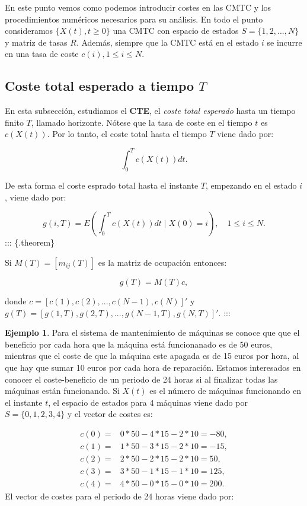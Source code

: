 \documentclass[
]{book}
\theoremstyle{definition}
\theoremstyle{definition}
\newtheorem{example}{Ejemplo}[chapter]
\theoremstyle{definition}
\theoremstyle{definition}
\theoremstyle{remark}
\begin{document}
En este punto vemos como podemos introducir costes en las CMTC y los procedimientos numéricos necesarios para su análisis. En todo el punto consideramos \(\{X(t), t \geq 0\}\) una CMTC con espacio de estados \(S = \{1, 2,...,N\}\) y matriz de tasas \(R\). Además, siempre que la CMTC está en el estado \(i\) se incurre en una tasa de coste \(c(i), 1 \leq i \leq N\).

\hypertarget{coste-total-esperado-a-tiempo-t}{%
\subsection{\texorpdfstring{Coste total esperado a tiempo \(T\)}{Coste total esperado a tiempo T}}\label{coste-total-esperado-a-tiempo-t}}

En esta subsección, estudiamos el \textbf{CTE}, el \emph{coste total esperado} hasta un tiempo finito \(T\), llamado horizonte. Nótese que la tasa de coste en el tiempo \(t\) es \(c(X(t))\). Por lo tanto, el coste total hasta el tiempo \(T\) viene dado por:

\[\int_0^T c(X(t))dt.\]

De esta forma el coste esprado total hasta el instante \(T\), empezando en el estado \(i\), viene dado por:

\[g(i, T) = E\left( \int_0^T c(X(t))dt \mid X(0) = i \right), \quad 1 \leq i \leq N.\]
::: \{.theorem\}

Si \(M(T) = [m_{ij}(T)]\) es la matriz de ocupación entonces:

\[g(T) = M(T)c,\]

donde \(c = [c(1), c(2),...,c(N-1), c(N)]'\) y \(g(T) = [g(1, T), g(2,T),..., g(N-1, T), g(N, T)]'.\)
:::

\begin{example}
Para el sistema de mantenimiento de máquinas se conoce que que el beneficio por cada hora que la máquina está funcionanado es de 50 euros, mientras que el coste de que la máquina este apagada es de 15 euros por hora, al que hay que sumar 10 euros por cada hora de reparación. Estamos interesados en conocer el coste-beneficio de un periodo de 24 horas si al finalizar todas las máquinas están funcionando. Si \(X(t)\) es el número de máquinas funcionando en el instante \(t\), el espacio de estados para 4 máquinas viene dado por \(S = \{0, 1, 2, 3, 4\}\) y el vector de costes es:
\end{example}

\[
\begin{matrix}
c(0) = & 0*50 - 4*15 - 2*10 = - 80,\\
c(1) = & 1*50 - 3*15 - 2*10 = - 15,\\
c(2) = & 2*50 - 2*15 - 2*10 = 50,\\
c(3) = & 3*50 - 1*15 - 1*10 = 125,\\
c(4) = & 4*50 - 0*15 - 0*10 = 200.
\end{matrix}
\]
El vector de costes para el periodo de 24 horas viene dado por:
\end{document}
